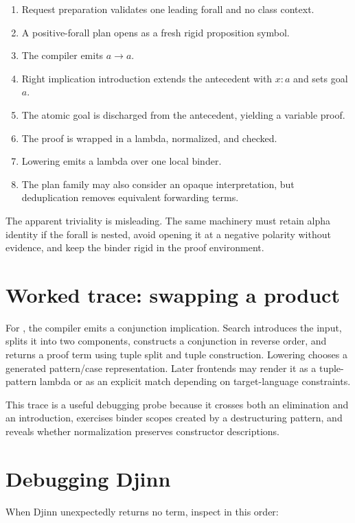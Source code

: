 \documentclass[10pt,letterpaper,oneside]{report}
\newcommand{\code}[1]{\texttt{\detokenize{#1}}}
\begin{document}
\begin{enumerate}
  \item Request preparation validates one leading forall and no class context.
  \item A positive-forall plan opens \code{a} as a fresh rigid proposition symbol.
  \item The compiler emits \(a \to a\).
  \item Right implication introduction extends the antecedent with \(x:a\) and sets goal \(a\).
  \item The atomic goal is discharged from the antecedent, yielding a variable proof.
  \item The proof is wrapped in a lambda, normalized, and checked.
  \item Lowering emits a lambda over one local binder.
  \item The plan family may also consider an opaque interpretation, but deduplication removes equivalent forwarding terms.
\end{enumerate}

The apparent triviality is misleading. The same machinery must retain alpha identity if the forall is nested, avoid opening it at a negative polarity without evidence, and keep the binder rigid in the proof environment.

\section{Worked trace: swapping a product}

For \code{(a,b) -> (b,a)}, the compiler emits a conjunction implication. Search introduces the input, splits it into two components, constructs a conjunction in reverse order, and returns a proof term using tuple split and tuple construction. Lowering chooses a generated pattern/case representation. Later frontends may render it as a tuple-pattern lambda or as an explicit match depending on target-language constraints.

This trace is a useful debugging probe because it crosses both an elimination and an introduction, exercises binder scopes created by a destructuring pattern, and reveals whether normalization preserves constructor descriptions.

\section{Debugging Djinn}

When Djinn unexpectedly returns no term, inspect in this order:
\end{document}

